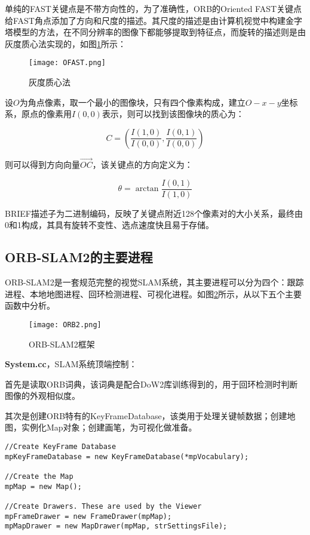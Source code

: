 单纯的FAST关键点是不带方向性的，为了准确性，ORB的Oriented FAST关键点给FAST角点添加了方向和尺度的描述。其尺度的描述是由计算机视觉中构建金字塔模型的方法，在不同分辨率的图像下都能够提取到特征点，而旋转的描述则是由灰度质心法实现的，如图\ref{fig8}所示：

\begin{figure}[!ht]
	\centering
	\texttt{[image: OFAST.png]}
	\caption{灰度质心法}
	\label{fig8}
\end{figure}

设$O$为角点像素，取一个最小的图像块，只有四个像素构成，建立$O-x-y$坐标系，原点的像素用$I(0,0)$表示，则可以找到该图像块的质心为：

\begin{equation}
C=(\frac{I(1,0)}{I(0,0)}, \frac{I(0,1)}{I(0,0)})
\end{equation}

则可以得到方向向量$\vec{OC}$，该关键点的方向定义为：

\begin{equation}
\theta = \arctan{\frac{I(0,1)}{I(1,0)}}
\end{equation}


BRIEF描述子为二进制编码，反映了关键点附近128个像素对的大小关系，最终由0和1构成，其具有旋转不变性、选点速度快且易于存储。

\subsection{ORB-SLAM2的主要进程} \label{3.2.2}

ORB-SLAM2是一套规范完整的视觉SLAM系统，其主要进程可以分为四个：跟踪进程、本地地图进程、回环检测进程、可视化进程\cite{mur2017orb}。如图\ref{fig9}所示，从以下五个主要函数中分析。

\begin{figure}[!ht]
	\centering
	\texttt{[image: ORB2.png]}
	\caption{ORB-SLAM2框架}
	\label{fig9}
\end{figure}

\textbf{System.cc}，SLAM系统顶端控制：

首先是读取ORB词典，该词典是配合DoW2库训练得到的，用于回环检测时判断图像的外观相似度。

其次是创建ORB特有的KeyFrameDatabase，该类用于处理关键帧数据；创建地图，实例化Map对象；创建画笔，为可视化做准备。

\begin{verbatim}
//Create KeyFrame Database
mpKeyFrameDatabase = new KeyFrameDatabase(*mpVocabulary);

//Create the Map
mpMap = new Map();

//Create Drawers. These are used by the Viewer
mpFrameDrawer = new FrameDrawer(mpMap);
mpMapDrawer = new MapDrawer(mpMap, strSettingsFile);
\end{verbatim}

